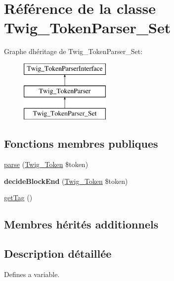 \hypertarget{class_twig___token_parser___set}{}\section{Référence de la classe Twig\+\_\+\+Token\+Parser\+\_\+\+Set}
\label{class_twig___token_parser___set}
Graphe d\textquotesingle{}héritage de Twig\+\_\+\+Token\+Parser\+\_\+\+Set\+:\begin{figure}[H]
\begin{center}
\leavevmode
\includegraphics[height=3.000000cm]{class_twig___token_parser___set}
\end{center}
\end{figure}
\subsection*{Fonctions membres publiques}
\begin{DoxyCompactItemize}
\item 
\hyperlink{class_twig___token_parser___set_a5dfa2e269321584fb74e8b43dabe0efd}{parse} (\hyperlink{class_twig___token}{Twig\+\_\+\+Token} \$token)
\item 
{\bfseries decide\+Block\+End} (\hyperlink{class_twig___token}{Twig\+\_\+\+Token} \$token)\hypertarget{class_twig___token_parser___set_aa976dc013d35c2813752149bacd88902}{}\label{class_twig___token_parser___set_aa976dc013d35c2813752149bacd88902}

\item 
\hyperlink{class_twig___token_parser___set_ab86ba36154b20e6bbfa3ba705f12f9d6}{get\+Tag} ()
\end{DoxyCompactItemize}
\subsection*{Membres hérités additionnels}


\subsection{Description détaillée}
Defines a variable.


